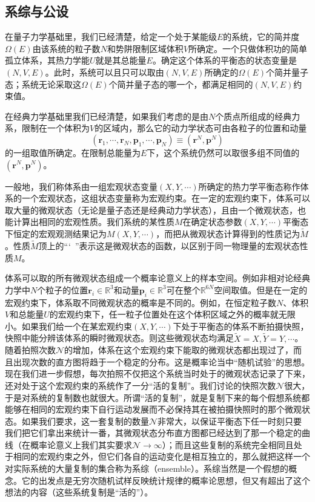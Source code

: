 \documentclass[main.tex]{subfiles}
\begin{document}
\subsection{系综与公设}


在量子力学基础里，我们已经清楚，给定一个处于某能级$E$的系统，它的简并度$\Omega\left(E\right)$由该系统的粒子数$N$和势阱限制区域体积$V$所确定。一个只做体积功的简单孤立体系，其热力学能$U$就是其总能量$E$。确定这个体系的平衡态的状态变量是$\left(N,V,E\right)$。此时，系统可以且只可以取由$\left(N,V,E\right)$所确定的$\Omega\left(E\right)$个简并量子态；系统无论采取这$\Omega\left(E\right)$个简并量子态的哪一个，都满足相同的$\left(N,V,E\right)$约束值。

在经典力学基础里我们已经清楚，如果我们考虑的是由$N$个质点所组成的经典力系，限制在一个体积为$V$的区域内，那么它的动力学状态可由各粒子的位置和动量
\[\left(\mathbf{r}_1,\cdots,\mathbf{r}_N,\mathbf{p}_1,\cdots,\mathbf{p}_N\right)\equiv\left(\mathbf{r}^N,\mathbf{p}^N\right)\]
的一组取值所确定。在限制总能量为$E$下，这个系统仍然可以取很多组不同值的$\left(\mathbf{r}^N,\mathbf{p}^N\right)$。

一般地，我们称体系由一组宏观状态变量$\left(X,Y,\cdots\right)$所确定的热力学平衡态称作体系的一个宏观状态，这组状态变量称为宏观约束。在一定的宏观约束下，体系可以取大量的微观状态（无论是量子态还是经典动力学状态），且由一个微观状态，也能计算出相同的宏观性质。我们系统的某性质$M$在确定状态参数$\left(X,Y,\cdots\right)$平衡态下恒定的宏观观测结果记为$M\left(X,Y,\cdots\right)$，而把从微观状态计算得到的性质记为$\tilde{M}$。性质$\tilde{M}$顶上的“\char`~”表示这是微观状态的函数，以区别于同一物理量的宏观状态性质$M$。

体系可以取的所有微观状态组成一个概率论意义上的样本空间。例如非相对论经典力学中$N$个粒子的位置$\mathbf{r}_i\in\mathbb{R}^3$和动量$\mathbf{p}_i\in\mathbb{R}^3$可在整个$\mathbb{R}^{6N}$空间取值。但是在一定的宏观约束下，体系取不同微观状态的概率是不同的。例如，在恒定粒子数$N$、体积$V$和总能量$U$的宏观约束下，任一粒子位置处在这个体积区域之外的概率就无限小。如果我们给一个在某宏观约束$\left(X,Y,\cdots\right)$下处于平衡态的体系不断拍摄快照，快照中能分辨该体系的瞬时微观状态。则这些微观状态均满足$\tilde{X}=X,\tilde{Y}=Y,\cdots$。随着拍照次数$\mathcal{N}$的增加，体系在这个宏观约束下能取的微观状态都出现过了，而且出现次数的直方图将趋于一个稳定的分布。这是概率论当中“随机试验”的思想。现在我们进一步假想，每次拍照不仅把这个系统当时处于的微观状态记录了下来，还对处于这个宏观约束的系统作了一分“活的复制”。我们讨论的快照次数$\mathcal{N}$很大，于是对系统的复制数也就很大。所谓“活的复制”，就是复制下来的每个假想系统都能够在相同的宏观约束下自行运动发展而不必保持其在被拍摄快照时的那个微观状态。如果我们要求，这一套复制的数量$\mathcal{N}$非常大，以保证平衡态下任一时刻只要我们把它们拿出来统计一番，其微观状态分布直方图都已经达到了那一个稳定的曲线（在概率论意义上我们其实要求$\mathcal{N}\rightarrow\infty$）；而且这些复制的系统完全相同且处于相同的宏观约束之外，但它们各自的运动变化是相互独立的，那么就把这样一个对实际系统的大量复制的集合称为系综（ensemble）。系综当然是一个假想的概念。它的出发点是无穷次随机试样反映统计规律的概率论思想，但又有超出了这个想法的内容（这些系统复制是“活的”）。
\end{document}
